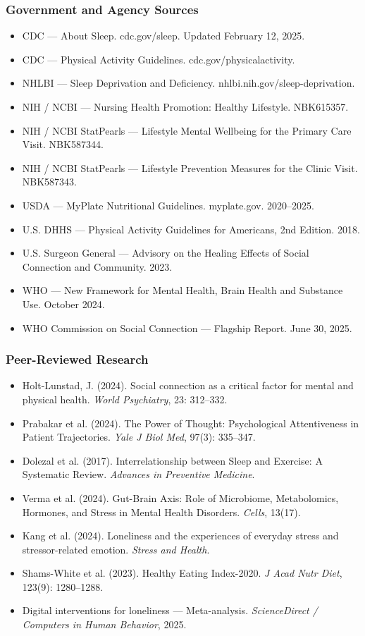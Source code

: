 \documentclass[11pt,letterpaper]{article}
\begin{document}
\subsubsection{Government and Agency Sources}
\begin{itemize}[leftmargin=1.5em]
  \item CDC --- About Sleep. cdc.gov/sleep. Updated February 12, 2025.
  \item CDC --- Physical Activity Guidelines. cdc.gov/physicalactivity.
  \item NHLBI --- Sleep Deprivation and Deficiency. nhlbi.nih.gov/sleep-deprivation.
  \item NIH / NCBI --- Nursing Health Promotion: Healthy Lifestyle. NBK615357.
  \item NIH / NCBI StatPearls --- Lifestyle Mental Wellbeing for the Primary Care Visit. NBK587344.
  \item NIH / NCBI StatPearls --- Lifestyle Prevention Measures for the Clinic Visit. NBK587343.
  \item USDA --- MyPlate Nutritional Guidelines. myplate.gov. 2020--2025.
  \item U.S. DHHS --- Physical Activity Guidelines for Americans, 2nd Edition. 2018.
  \item U.S. Surgeon General --- Advisory on the Healing Effects of Social Connection and Community. 2023.
  \item WHO --- New Framework for Mental Health, Brain Health and Substance Use. October 2024.
  \item WHO Commission on Social Connection --- Flagship Report. June 30, 2025.
\end{itemize}

\subsubsection{Peer-Reviewed Research}
\begin{itemize}[leftmargin=1.5em]
  \item Holt-Lunstad, J. (2024). Social connection as a critical factor for mental and physical health. \textit{World Psychiatry}, 23: 312--332.
  \item Prabakar et al. (2024). The Power of Thought: Psychological Attentiveness in Patient Trajectories. \textit{Yale J Biol Med}, 97(3): 335--347.
  \item Dolezal et al. (2017). Interrelationship between Sleep and Exercise: A Systematic Review. \textit{Advances in Preventive Medicine}.
  \item Verma et al. (2024). Gut-Brain Axis: Role of Microbiome, Metabolomics, Hormones, and Stress in Mental Health Disorders. \textit{Cells}, 13(17).
  \item Kang et al. (2024). Loneliness and the experiences of everyday stress and stressor-related emotion. \textit{Stress and Health}.
  \item Shams-White et al. (2023). Healthy Eating Index-2020. \textit{J Acad Nutr Diet}, 123(9): 1280--1288.
  \item Digital interventions for loneliness --- Meta-analysis. \textit{ScienceDirect / Computers in Human Behavior}, 2025.
\end{itemize}
\end{document}
